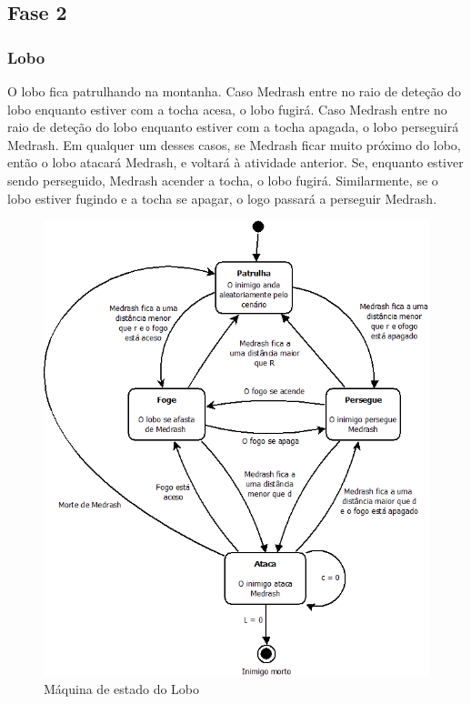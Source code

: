 \subsection{Fase 2}

\subsubsection{Lobo}

O lobo fica patrulhando na montanha. Caso Medrash entre no raio de
deteção do lobo enquanto estiver com a tocha acesa, o lobo fugirá. Caso
Medrash entre no raio de deteção do lobo enquanto estiver com a tocha
apagada, o lobo perseguirá Medrash. Em qualquer um desses casos, se
Medrash ficar muito próximo do lobo, então o lobo atacará Medrash, e
voltará à atividade anterior.
Se, enquanto estiver sendo perseguido, Medrash acender a tocha,
o lobo fugirá. Similarmente, se o lobo estiver fugindo e a tocha se apagar,
o logo passará a perseguir Medrash.

\begin{figure}[!ht]
 \centering
 \includegraphics[scale=0.5]{ia_lobo.png}
 \caption{Máquina de estado do Lobo}
 \label{fsm:lobo}
\end{figure}

